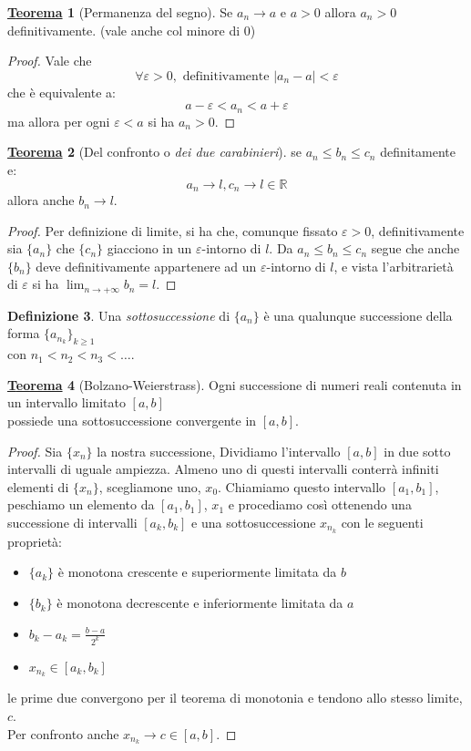 \documentclass[a4paper,twoside]{article}
\renewcommand{\epsilon}{\varepsilon}
\newcommand{\R}{\mathbb{R}}
\theoremstyle{definition}
\newtheorem{theorem}{\color{Red}\underline{\textrm Teorema}}
\newenvironment{theo}
  {\begin{shaded}\begin{theorem}}
  {\end{theorem}\end{shaded}}
\newtheorem{definizione}[theorem]{Definizione}
\numberwithin{theorem}{section}
\begin{document}
\begin{theorem}[Permanenza del segno]
Se $a_n \to a$ e $a>0$ allora $a_n>0$ definitivamente.
(vale anche col minore di 0)
\end{theorem}
\begin{proof}
Vale che $$\forall\epsilon>0,\text{ definitivamente }|a_n-a|<\epsilon$$
che è equivalente a:
$$a-\epsilon<a_n<a+\epsilon$$
ma allora per ogni $\epsilon < a$ si ha $a_n>0$.
\end{proof}

\begin{theorem}[Del confronto o \emph{dei due carabinieri}]
se $a_n\leq b_n \leq c_n$ definitamente e: 
$$a_n\to l, c_n \to l \in \R$$
allora anche $b_n\to l$.
\end{theorem}
\begin{proof}
Per definizione di limite, si ha che, comunque fissato $\epsilon >0$, definitivamente sia $\{a_n\}$ che $\{c_n\}$ giacciono in un $\epsilon$-intorno di $l$. Da $a_n\leq b_n\leq c_n$ segue che anche $\{b_n\}$ deve  definitivamente appartenere ad un $\epsilon$-intorno di $l$, e vista l'arbitrarietà di $\epsilon$ si ha $\lim_{n\to +\infty} b_n = l$. 
\end{proof}

\begin{definizione} Una \emph{sottosuccessione} di $\{a_n\}$ è una qualunque successione della forma $\{a_{n_k}\}_{k\geq 1}$\\ con $n_1 < n_2 < n_3 < \ldots$. 
\end{definizione}

\begin{theo}[Bolzano-Weierstrass]
Ogni successione di numeri reali contenuta in un intervallo limitato $[a,b]$\\ possiede una sottosuccessione convergente in $[a,b]$.\end{theo}
\begin{proof}
Sia $\{x_n\}$ la nostra successione, Dividiamo l'intervallo $[a,b]$ in due sotto intervalli di uguale ampiezza. Almeno uno di questi intervalli conterrà infiniti elementi di $\{x_n\}$, scegliamone uno, $x_0$. Chiamiamo questo intervallo $[a_1,b_1]$, peschiamo un elemento da $[a_1,b_1]$, $x_1$ e procediamo così ottenendo una successione di intervalli $[a_k,b_k]$ e una sottosuccessione $x_{n_k}$ con le seguenti proprietà:
\begin{itemize}
\item $\{a_k\}$ è monotona crescente e superiormente limitata da $b$
\item $\{b_k\}$ è monotona decrescente e inferiormente limitata da $a$
\item $b_k-a_k=\frac{b-a}{2^k}$
\item $x_{n_k}\in [a_k,b_k]$
\end{itemize}
le prime due convergono per il teorema di monotonia e tendono allo stesso limite, $c$.\\ Per confronto anche $x_{n_k}\to c\in [a,b]$.
\end{proof}
\end{document}
